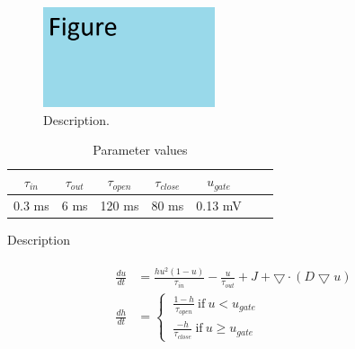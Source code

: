 \begin{figure}[!ht]
\centering
\includegraphics[width = 0.45\textwidth]{figure/place_holder.png}
\caption{Description.}
\label{fig:place_holder}
\end{figure}

\begin{table}[!ht]
    \centering
    \caption{Parameter values}
    \begin{tabular}{ ccccccc }
    \hline
    $\tau_{in}$ & $\tau_{out}$ & $\tau_{open}$ & $\tau_{close}$ & $u_{gate}$ \\\hline
    0.3 ms & 6 ms & 120 ms & 80 ms & 0.13 mV \\ 
    \hline
    \end{tabular}
    \label{tb:parameter}
    \begin{flushleft}
    Description
    \end{flushleft}
\end{table}

\begin{align}
\label{eq:mitchell schaeffer}
\begin{split}
\frac{du}{dt}&=\frac{hu^2(1-u)}{\tau _{in}}-\frac{u}{\tau _{out}}+J+\bigtriangledown \cdot (D\bigtriangledown u)
\\
\frac{dh}{dt}&=\left\{\begin{matrix}\ \frac{1-h}{\tau_{open}} \ \text{if}\ u<u_{gate} \\ \ \frac{-h}{\tau_{close}} \ \text{if}\ u \geq u_{gate}\end{matrix}\right.
\end{split}
\end{align}